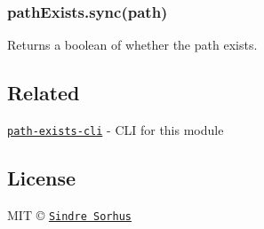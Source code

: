 \subsubsection*{path\+Exists.\+sync(path)}

Returns a boolean of whether the path exists.

\subsection*{Related}


\begin{DoxyItemize}
\item \href{https://github.com/sindresorhus/path-exists-cli}{\tt path-\/exists-\/cli} -\/ C\+LI for this module
\end{DoxyItemize}

\subsection*{License}

M\+IT © \href{https://sindresorhus.com}{\tt Sindre Sorhus} 